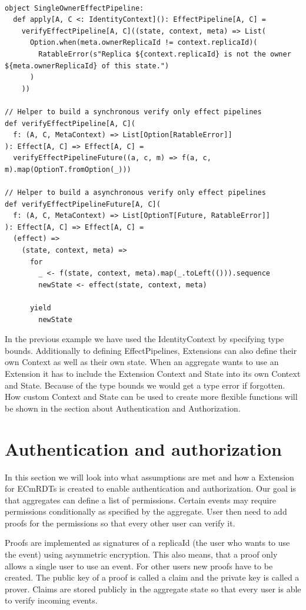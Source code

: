 \documentclass[
	ngerman,
	ruledheaders=section,   %
	class=report,		    %
	thesis={type=bachelor}, %
	accentcolor=9c,			%
	custommargins=true,    %
	marginpar=false,        %
	parskip=half-,          %
	fontsize=11pt,          %
]{tudapub}
\begin{document}
\begin{lstlisting}
  
object SingleOwnerEffectPipeline:
  def apply[A, C <: IdentityContext](): EffectPipeline[A, C] =
    verifyEffectPipeline[A, C]((state, context, meta) => List(
      Option.when(meta.ownerReplicaId != context.replicaId)(
        RatableError(s"Replica ${context.replicaId} is not the owner ${meta.ownerReplicaId} of this state.")
      )
    ))

// Helper to build a synchronous verify only effect pipelines
def verifyEffectPipeline[A, C](
  f: (A, C, MetaContext) => List[Option[RatableError]]
): Effect[A, C] => Effect[A, C] =
  verifyEffectPipelineFuture((a, c, m) => f(a, c, m).map(OptionT.fromOption(_)))
  
// Helper to build a asynchronous verify only effect pipelines
def verifyEffectPipelineFuture[A, C](
  f: (A, C, MetaContext) => List[OptionT[Future, RatableError]]
): Effect[A, C] => Effect[A, C] =
  (effect) =>
    (state, context, meta) => 
      for
        _ <- f(state, context, meta).map(_.toLeft(())).sequence
        newState <- effect(state, context, meta)

      yield
        newState

\end{lstlisting}

In the previous example we have used the IdentityContext by specifying type bounds. Additionally to defining EffectPipelines, Extensions can also define their own Context as well as their own state. When an aggregate wants to use an Extension it has to include the Extension Context and State into its own Context and State. Because of the type bounds we would get a type error if forgotten. How custom Context and State can be used to create more flexible functions will be shown in the section about Authentication and Authorization.

\section{Authentication and authorization}
In this section we will look into what assumptions are met and how a Extension for ECmRDTs is created to enable authentication and authorization. Our goal is that aggregates can define a list of permissions. Certain events may require permissions conditionally as specified by the aggregate. User then need to add proofs for the permissions so that every other user can verify it. 

Proofs are implemented as signatures of a replicaId (the user who wants to use the event) using asymmetric encryption. This also means, that a proof only allows a single user to use an event. For other users new proofs have to be created. The public key of a proof is called a claim and the private key is called a prover. Claims are stored publicly in the aggregate state so that every user is able to verify incoming events.
\end{document}
